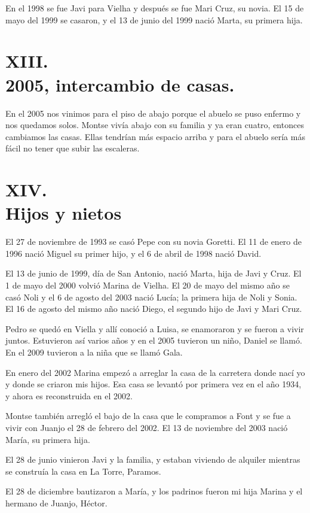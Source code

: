 \documentclass[12pt,a5paper]{book}
\begin{document}
En el 1998 se fue Javi para Vielha y después se fue Mari Cruz, su novia. El 15 de mayo del 1999 se casaron, y el 13 de junio del 1999 nació Marta, su primera hija.


\section*{XIII.\\2005, intercambio de casas.}

En el 2005 nos vinimos para el piso de abajo porque el abuelo se puso enfermo y nos quedamos solos. Montse vivía abajo con su familia y ya eran cuatro, entonces cambiamos las casas. Ellas tendrían más espacio arriba y para el abuelo sería más fácil no tener que subir las escaleras.


\section*{XIV.\\Hijos y nietos}

El 27 de noviembre de 1993 se casó Pepe con su novia Goretti. El 11 de enero de 1996 nació Miguel su primer hijo, y el 6 de abril de 1998 nació David.

El 13 de junio de 1999, día de San Antonio, nació Marta, hija de Javi y Cruz. El 1 de mayo del 2000 volvió Marina de Vielha. El 20 de mayo del mismo año se casó Noli y el 6 de agosto del 2003 nació Lucía; la primera hija de Noli y Sonia. El 16 de agosto del mismo año nació Diego, el segundo hijo de Javi y Mari Cruz.

Pedro se quedó en Viella y allí conoció a Luisa, se enamoraron y se fueron a vivir juntos. Estuvieron así varios años y en el 2005 tuvieron un niño, Daniel se llamó. En el 2009 tuvieron a la niña que se llamó Gala.

En enero del 2002 Marina empezó a arreglar la casa de la carretera donde nací yo y donde se criaron mis hijos. Esa casa se levantó por primera vez en el año 1934, y ahora es reconstruida en el 2002.

Montse también arregló el bajo de la casa que le compramos a Font y se fue a vivir con Juanjo el 28 de febrero del 2002. El 13 de noviembre del 2003 nació María, su primera hija.

El 28 de junio vinieron Javi y la familia, y estaban viviendo de alquiler mientras se construía la casa en La Torre, Paramos.

El 28 de diciembre bautizaron a María, y los padrinos fueron mi hija Marina y el hermano de Juanjo, Héctor.
\end{document}
